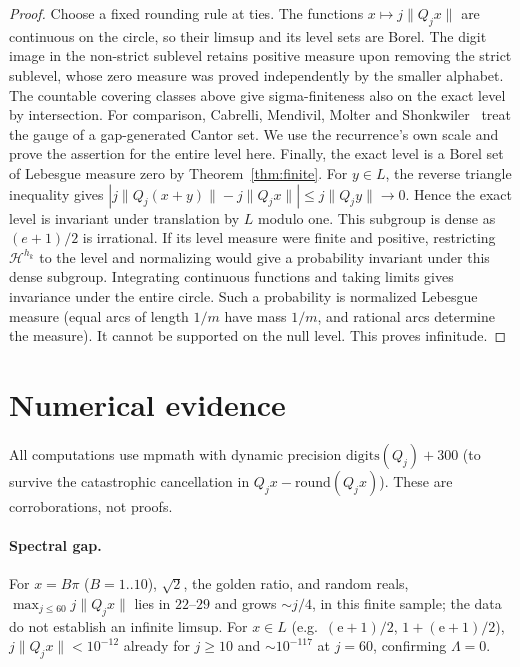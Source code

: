\documentclass[11pt]{article}
\theoremstyle{definition}
\theoremstyle{remark}
\newcommand{\ee}{\mathrm{e}}
\newcommand{\Lam}{\Lambda}
\begin{document}
\begin{proof}
Choose a fixed rounding rule at ties. The functions
$x\mapsto j\|Q_jx\|$ are continuous on the circle, so their limsup
and its level sets are Borel. The digit image in the non-strict
sublevel retains positive measure upon removing the strict sublevel,
whose zero measure was proved independently by the smaller alphabet.
The countable covering classes above give sigma-finiteness also on
the exact level by intersection. For comparison, Cabrelli, Mendivil,
Molter and Shonkwiler~\cite[Thm.~3]{CMMS}
treat the gauge of a gap-generated Cantor set. We use the recurrence's
own scale and prove the assertion for the entire level here.
Finally, the exact level is a Borel set of Lebesgue measure zero by
Theorem~\ref{thm:finite}. For $y\in L$, the reverse triangle inequality gives
$|j\|Q_j(x+y)\|-j\|Q_jx\||\le j\|Q_jy\|\to0$.
Hence the exact level is invariant under translation by $L$ modulo one. This subgroup is dense as
$(e+1)/2$ is irrational. If its level measure were finite and positive,
restricting $\mathcal H^{h_k}$ to the level and normalizing would give
a probability invariant under this dense subgroup. Integrating continuous
functions and taking limits gives invariance under the entire circle.
Such a probability is normalized Lebesgue measure (equal arcs of length
$1/m$ have mass $1/m$, and rational arcs determine the measure).
It cannot be supported on the null level. This proves infinitude.
\end{proof}

\section{Numerical evidence}\label{sec:num}

All computations use mpmath with dynamic precision $\mathrm{digits}(Q_j)+300$
(to survive the catastrophic cancellation in $Q_jx-\mathrm{round}(Q_jx)$).
These are corroborations, not proofs.

\paragraph{Spectral gap.} For $x=B\pi$ ($B=1..10$), $\sqrt2$, the golden ratio,
and random reals, $\max_{j\le60}j\|Q_jx\|$ lies in $22$--$29$ and grows
$\sim j/4$, in this finite sample; the data do not establish an infinite limsup. For $x\in L$ (e.g.\ $(\ee+1)/2$,
$1+(\ee+1)/2$), $j\|Q_jx\|<10^{-12}$ already for $j\ge10$ and $\sim10^{-117}$
at $j=60$, confirming $\Lam=0$.
\end{document}
